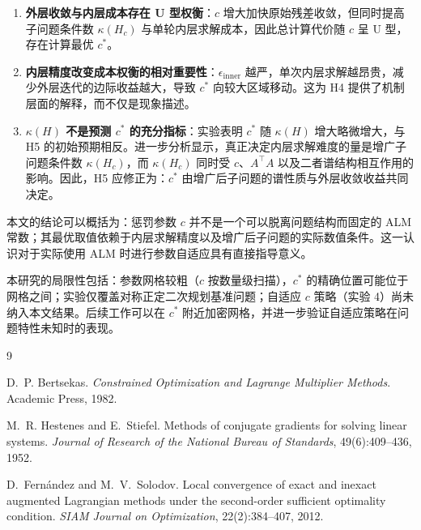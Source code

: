 \documentclass[UTF8]{ctexart}
\numberwithin{figure}{section}
\theoremstyle{definition}
\theoremstyle{examplestyle}
\theoremstyle{remark}
\begin{document}
\begin{enumerate}
\item \textbf{外层收敛与内层成本存在 U 型权衡}：$c$ 增大加快原始残差收敛，但同时提高子问题条件数 $\kappa(H_c)$ 与单轮内层求解成本，因此总计算代价随 $c$ 呈 U 型，存在计算最优 $c^*$。
\item \textbf{内层精度改变成本权衡的相对重要性}：$\epsilon_{\mathrm{inner}}$ 越严，单次内层求解越昂贵，减少外层迭代的边际收益越大，导致 $c^*$ 向较大区域移动。这为 H4 提供了机制层面的解释，而不仅是现象描述。
\item \textbf{$\kappa(H)$ 不是预测 $c^*$ 的充分指标}：实验表明 $c^*$ 随 $\kappa(H)$ 增大略微增大，与 H5 的初始预期相反。进一步分析显示，真正决定内层求解难度的量是增广子问题条件数 $\kappa(H_c)$，而 $\kappa(H_c)$ 同时受 $c$、$A^\top A$ 以及二者谱结构相互作用的影响。因此，H5 应修正为：$c^*$ 由增广后子问题的谱性质与外层收敛收益共同决定。
\end{enumerate}

本文的结论可以概括为：惩罚参数 $c$ 并不是一个可以脱离问题结构而固定的 ALM 常数；其最优取值依赖于内层求解精度以及增广后子问题的实际数值条件。这一认识对于实际使用 ALM 时进行参数自适应具有直接指导意义。

本研究的局限性包括：参数网格较粗（$c$ 按数量级扫描），$c^*$ 的精确位置可能位于网格之间；实验仅覆盖对称正定二次规划基准问题；自适应 $c$ 策略（实验 4）尚未纳入本文结果。后续工作可以在 $c^*$ 附近加密网格，并进一步验证自适应策略在问题特性未知时的表现。

\begin{thebibliography}{9}

D.~P. Bertsekas.
\emph{Constrained Optimization and Lagrange Multiplier Methods}.
Academic Press, 1982.

M.~R. Hestenes and E.~Stiefel.
Methods of conjugate gradients for solving linear systems.
\emph{Journal of Research of the National Bureau of Standards}, 49(6):409--436, 1952.

D.~Fern\'andez and M.~V.~Solodov.
Local convergence of exact and inexact augmented Lagrangian methods under the second-order sufficient optimality condition.
\emph{SIAM Journal on Optimization}, 22(2):384--407, 2012.

\end{thebibliography}
\end{document}
